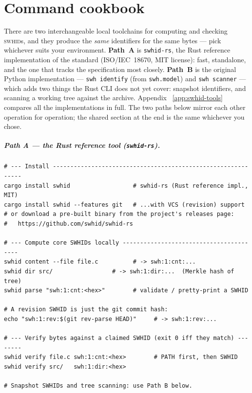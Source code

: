 \chapter{Command cookbook}
\label{app:cookbook}

There are two interchangeable local toolchains for computing and checking \textsc{swhid}s, and
they produce the \emph{same} identifiers for the same bytes --- pick whichever suits your
environment. \textbf{Path~A} is \texttt{swhid-rs}, the Rust reference implementation of the
standard (ISO/IEC~18670, MIT license): fast, standalone, and the one that tracks the specification
most closely. \textbf{Path~B} is the original Python implementation --- \texttt{swh identify}
(from \texttt{swh.model}) and \texttt{swh scanner} --- which adds two things the Rust CLI does not
yet cover: snapshot identifiers, and scanning a working tree against the archive. Appendix~%
\ref{app:swhid-tools} compares all the implementations in full. The two paths below mirror each
other operation for operation; the shared section at the end is the same whichever you chose.

\paragraph{Path A --- the Rust reference tool (\texttt{swhid-rs}).}
\begin{verbatim}
# --- Install -------------------------------------------------------------
cargo install swhid                  # swhid-rs (Rust reference impl., MIT)
cargo install swhid --features git   # ...with VCS (revision) support
# or download a pre-built binary from the project's releases page:
#   https://github.com/swhid/swhid-rs

# --- Compute core SWHIDs locally ----------------------------------------
swhid content --file file.c          # -> swh:1:cnt:...
swhid dir src/                 # -> swh:1:dir:...  (Merkle hash of tree)
swhid parse "swh:1:cnt:<hex>"        # validate / pretty-print a SWHID

# A revision SWHID is just the git commit hash:
echo "swh:1:rev:$(git rev-parse HEAD)"     # -> swh:1:rev:...

# --- Verify bytes against a claimed SWHID (exit 0 iff they match) --------
swhid verify file.c swh:1:cnt:<hex>        # PATH first, then SWHID
swhid verify src/   swh:1:dir:<hex>

# Snapshot SWHIDs and tree scanning: use Path B below.
\end{verbatim}

